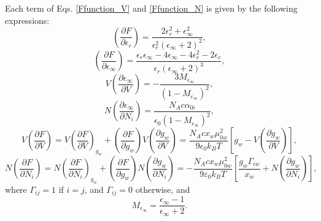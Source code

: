 Each term of Eqs. \eqref{Ffunction_V} and \eqref{Ffunction_N} is given by the following expressions:
\begin{equation}
         \left ( \frac{\partial F}{\partial \epsilon_r} \right )=\frac{2\epsilon_r^2+\epsilon_\infty^2}{\epsilon_r^2\left ( \epsilon_\infty+2 \right )^2},
        \label{dFder}
\end{equation}
\begin{equation}
          \left ( \frac{\partial F}{\partial \epsilon_\infty} \right )=\frac{\epsilon_r\epsilon_\infty - 4 \epsilon_\infty -4\epsilon_r^2-2\epsilon_r}{\epsilon_r\left ( \epsilon_\infty+2 \right )^3},
        \label{dFdeinf}
\end{equation}
\begin{equation}
          V\left ( \frac{\partial \epsilon_\infty}{\partial V} \right )=- \frac{3M_{\epsilon_\infty}}{\left ( 1 - M_{\epsilon_\infty} \right )^2},
        \label{deinfdV}
\end{equation}
\begin{equation}
          N\left ( \frac{\partial \epsilon_\infty}{\partial N_i} \right )=\frac{N_A c \alpha_{0i}}{\epsilon_0 \left ( 1 - M_{\epsilon_\infty} \right )^2},
        \label{deinfdNi}
\end{equation}
\begin{equation}
           V\left ( \frac{\partial F}{\partial V} \right )= V \left ( \frac{\partial F}{\partial V} \right )_{g_w} + \left ( \frac{\partial F}{\partial g_w} \right ) V\left ( \frac{\partial g_w}{\partial V} \right ) = \frac{N_Ac x_w\mu_{0w}^2}{9\epsilon_0k_BT}\left [ g_w -  V \left ( \frac{\partial g_w}{\partial V} \right ) \right ],
        \label{dFdV}
\end{equation}
\begin{equation}
            N\left ( \frac{\partial F}{\partial N_i} \right )= N \left ( \frac{\partial F}{\partial N_i} \right )_{g_w} + \left ( \frac{\partial F}{\partial g_w} \right ) N\left ( \frac{\partial g_w}{\partial N_i} \right ) = -\frac{N_Ac x_w \mu_{0w}^2}{9\varepsilon_0k_BT}\left [ \frac{g_w \Gamma_{iw}}{x_w} +  N \left ( \frac{\partial g_w}{\partial N_i} \right ) \right ],
        \label{dFdNi}
\end{equation}
where $\Gamma_{ij} = 1$ if $i = j$, and $\Gamma_{ij} = 0$ otherwise, and
\begin{equation}
        M_{\epsilon_\infty} = \frac{\epsilon_\infty-1}{\epsilon_\infty+2}.
        \label{Eq:eps_infty}
\end{equation} 

